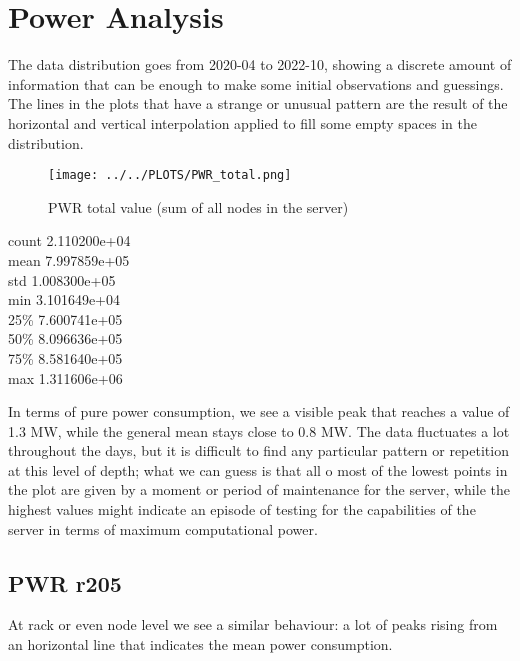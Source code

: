 \section{Power Analysis}
\noindent
The data distribution goes from 2020-04 to 2022-10, showing a discrete amount of information that can be enough to make some initial observations and guessings. \\
The lines in the plots that have a strange or unusual pattern are the result of the horizontal and vertical interpolation applied to fill some empty spaces in the distribution.

\vspace{-15pt}

\begin{figure}[H]
\centering
\texttt{[image: ../../PLOTS/PWR\_total.png]}
\captionsetup{skip=-10pt}
\caption{PWR total value (sum of all nodes in the server)}
\label{fig:PWR_total}
\end{figure}

\begin{center}
count    2.110200e+04 \\
mean     7.997859e+05 \\
std      1.008300e+05 \\
min      3.101649e+04 \\
25\%      7.600741e+05 \\
50\%      8.096636e+05 \\
75\%      8.581640e+05 \\
max      1.311606e+06
\end{center}

In terms of pure power consumption, we see a visible peak that reaches a value of 1.3 MW, while the general mean stays close to 0.8 MW. The data fluctuates a lot throughout the days, but it is difficult to find any particular pattern or repetition at this level of depth; what we can guess is that all o most of the lowest points in the plot are given by a moment or period of maintenance for the server, while the highest values might indicate an episode of testing for the capabilities of the server in terms of maximum computational power.

\subsection{PWR r205}
At rack or even node level we see a similar behaviour: a lot of peaks rising from an horizontal line that indicates the mean power consumption. 

